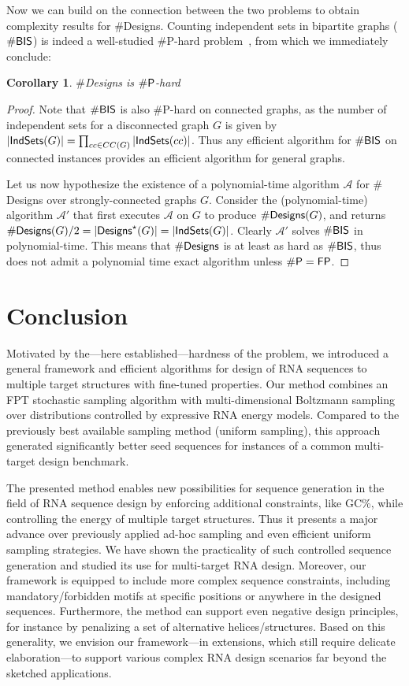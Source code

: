\documentclass{bioinfo}
\newtheorem{corollary}[theorem]{Corollary}
\newcommand{\Design}[1]{{\sf Designs}^{\star}(#1)}
\newcommand{\NumDesign}{\ensuremath{\#}{\sf Designs}\xspace}
\newcommand{\IS}[1]{{\sf IndSets}(#1)}
\newcommand{\Nuc}[1]{{\sf #1}}
\newcommand{\Cb}{\Nuc{C}}
\newcommand{\Gb}{\Nuc{G}}
\newcommand{\GCb}{\Gb\Cb}
\begin{document}
Now we can build on the connection between the two problems to obtain complexity results for \NumDesign. Counting independent sets in bipartite graphs ($\#{\sf BIS}$) is indeed a well-studied \#{\sf P}-hard problem~\citep{Ge2012}, from which we immediately conclude:
\begin{corollary}
  \NumDesign is $\#{\sf P}$-hard
\end{corollary}
\begin{proof}
  Note that $\#{\sf BIS}$ is also \#{\sf P}-hard on connected graphs, as the number of independent sets for a disconnected graph $G$ is given by $|\IS{G}|=\prod_{cc\in CC(G)} |\IS{cc}|$. Thus any efficient algorithm for $\#{\sf BIS}$ on connected instances provides an efficient algorithm for general graphs.

  Let us now hypothesize the existence of a polynomial-time algorithm $\mathcal{A}$ for \NumDesign over strongly-connected graphs $G$. Consider the (polynomial-time) algorithm $\mathcal{A}'$ that first executes $\mathcal{A}$ on $G$ to produce $\NumDesign(G)$, and returns $\NumDesign(G)/2=|\Design{G}| = |\IS{G}|$. Clearly $\mathcal{A}'$ solves $\#{\sf BIS}$ in polynomial-time. This means that $\NumDesign$  is at least as hard as $\#{\sf BIS}$, thus does not admit a polynomial time exact algorithm unless $\#{\sf P}={\sf FP}$.
\end{proof}

\section{Conclusion}
Motivated by the---here established---hardness of the problem, we
introduced a general framework and efficient algorithms for design of
RNA sequences to multiple target structures with fine-tuned
properties. Our method combines an FPT stochastic sampling algorithm
with multi-dimensional Boltzmann sampling over distributions
controlled by expressive RNA energy models.  Compared to the
previously best available sampling method (uniform sampling), this
approach generated significantly better seed sequences for instances
of a common multi-target design benchmark.

The presented method enables new possibilities for sequence generation
in the field of RNA sequence design by enforcing additional
constraints, like \GCb\%, while controlling the energy of
multiple target structures. Thus it presents a major advance over
previously applied ad-hoc sampling and even efficient uniform sampling
strategies. We have shown the practicality of such controlled sequence
generation and studied its use for multi-target RNA design. Moreover,
our framework is equipped to include more complex sequence
constraints, including mandatory/forbidden motifs at specific
positions or anywhere in the designed sequences. Furthermore, the
method can support even negative design principles, for instance by
penalizing a set of alternative helices/structures. Based on this
generality, we envision our framework---in extensions, which still
require delicate elaboration---to support various complex RNA design
scenarios far beyond the sketched applications.
\end{document}
